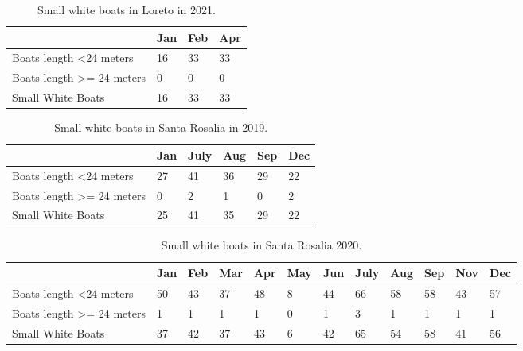 \begin{table}[h!]
\begin{tabular}{|l|l|l|l|}
\hline
                                       & Jan & Feb & Apr \\ \hline
Boats length \textless 24 meters       & 16  & 33  & 33  \\ \hline
Boats length \textgreater{}= 24 meters & 0   & 0   & 0   \\ \hline
Small White Boats                      & 16  & 33  & 33  \\ \hline
\end{tabular}
\caption{Small white boats in Loreto in 2021.}
\end{table}



\begin{table}[h!]
\begin{tabular}{|l|l|l|l|l|l|}
\hline
                                       & Jan & July & Aug & Sep & Dec \\ \hline
Boats length \textless 24 meters       & 27  & 41   & 36  & 29  & 22  \\ \hline
Boats length \textgreater{}= 24 meters & 0   & 2    & 1   & 0   & 2   \\ \hline
Small White Boats                      & 25  & 41   & 35  & 29  & 22  \\ \hline
\end{tabular}
\caption{Small white boats in Santa Rosalia in 2019.}
\end{table}


\begin{table}[h!]
\begin{tabular}{|l|l|l|l|l|l|l|l|l|l|l|l|}
\hline
                                       & Jan & Feb & Mar & Apr & May & Jun & July & Aug & Sep & Nov & Dec \\ \hline
Boats length \textless 24 meters       & 50  & 43  & 37  & 48  & 8   & 44  & 66   & 58  & 58  & 43  & 57  \\ \hline
Boats length \textgreater{}= 24 meters & 1   & 1   & 1   & 1   & 0   & 1   & 3    & 1   & 1   & 1   & 1   \\ \hline
Small White Boats                      & 37  & 42  & 37  & 43  & 6   & 42  & 65   & 54  & 58  & 41  & 56  \\ \hline
\end{tabular}
\caption{Small white boats in Santa Rosalia 2020.}
\end{table}



